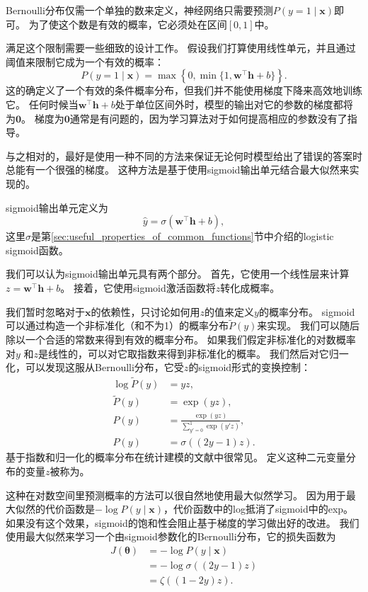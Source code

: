 Bernoulli分布仅需一个单独的数来定义，神经网络只需要预测$P(y =1\mid\bm{x})$即可。
为了使这个数是有效的概率，它必须处在区间$[0, 1]$中。

满足这个限制需要一些细致的设计工作。
假设我们打算使用线性单元，并且通过阈值来限制它成为一个有效的概率：
\begin{equation}
P(y=1 \mid \bm{x}) = \max \left \{ 0, \min \{1, \bm{w}^\top \bm{h}+b \} \right \}.
\end{equation}
这的确定义了一个有效的条件概率分布，但我们并不能使用梯度下降来高效地训练它。
任何时候当$\bm{w}^\top \bm{h}+b$处于单位区间外时，模型的输出对它的参数的梯度都将为$\bm{0}$。
梯度为$\bm{0}$通常是有问题的，因为学习算法对于如何提高相应的参数没有了指导。


与之相对的，最好是使用一种不同的方法来保证无论何时模型给出了错误的答案时总能有一个很强的梯度。
这种方法是基于使用sigmoid输出单元结合最大似然来实现的。

sigmoid输出单元定义为
\begin{equation}
\hat{y} = \sigma \left (\bm{w}^\top \bm{h} + b \right ),
\end{equation}
这里$\sigma$是第\ref{sec:useful_properties_of_common_functions}节中介绍的logistic sigmoid函数。

我们可以认为sigmoid输出单元具有两个部分。
首先，它使用一个线性层来计算$z=\bm{w}^\top \bm{h}+b$。
接着，它使用sigmoid激活函数将$z$转化成概率。

我们暂时忽略对于$\bm{x}$的依赖性，只讨论如何用$z$的值来定义$y$的概率分布。
sigmoid可以通过构造一个非标准化（和不为1）的概率分布$\tilde{P}(y)$来实现。
我们可以随后除以一个合适的常数来得到有效的概率分布。
如果我们假定非标准化的对数概率对$y$ 和$z$是线性的，可以对它取指数来得到非标准化的概率。
我们然后对它归一化，可以发现这服从Bernoulli分布，它受$z$的sigmoid形式的变换控制：
\begin{align}
\log \tilde{P}(y) &= yz,\\
\tilde{P}(y) &= \exp(yz),\\
P(y) &= \frac{\exp(yz)}{\sum_{y' = 0}^1 \exp(y' z)},\\
P(y) &= \sigma((2y-1)z).
\end{align}
基于指数和归一化的概率分布在统计建模的文献中很常见。
定义这种二元变量分布的变量$z$被称为。


这种在对数空间里预测概率的方法可以很自然地使用最大似然学习。
因为用于最大似然的代价函数是$-\log P(y\mid\bm{x})$，代价函数中的log抵消了sigmoid中的exp。
如果没有这个效果，sigmoid的饱和性会阻止基于梯度的学习做出好的改进。
我们使用最大似然来学习一个由sigmoid参数化的Bernoulli分布，它的损失函数为
\begin{align}
J(\bm{\theta}) &= -\log P(y\mid\bm{x})\\
&= -\log \sigma ((2y-1)z)\\
&= \zeta((1-2y)z).
\end{align}


